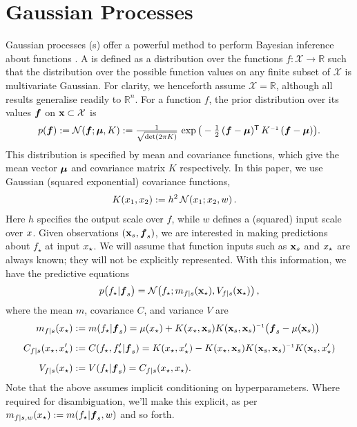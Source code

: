 \documentclass{article} %
\renewcommand{\pskinny}[2]{p\big(#1|#2\big)}
\begin{document}
\section{Gaussian Processes}
Gaussian processes (\gp s) offer a powerful method to perform Bayesian inference about functions \cite{GPsBook}. A \gpb is defined as a distribution over the functions $f: \mathcal{X} \rightarrow \mathbb{R}$ such that the distribution over the possible function values on any finite subset of $\mathcal{X}$ is multivariate Gaussian. For clarity, we henceforth assume $\mathcal{X} = \mathbb{R}$, although all results generalise readily to $\mathbb{R}^n$. For a function $f$, the prior distribution over its values $\vf$ on $\vlfv \subset \mathcal{X}$ is
\begin{align}%
\textstyle
 \po{\vf}\deq \N{\vf}{\vmu}{K}
 \deq\frac{1}{\sqrt{\det({2\pi K})}}\,\exp \big(-\frac{1}{2}\,(\vf-\vmu)\tra\,K\inv\,(\vf-\vmu)\big).
\end{align}
This distribution is specified by mean and covariance functions, which give the mean vector $\vmu$ and covariance matrix $K$ respectively. 
In this paper, we use Gaussian (squared exponential) covariance functions,
\begin{align} \label{eq:Gaussian_cov_fn}
\textstyle
K(\lfv_1,\lfv_2)& \deq h^2\,\N{\lfv_1}{\lfv_2}{w}.
\end{align} 
Here $h$ specifies the output scale over $f$, while $w$ defines a (squared) input scale over $\lfv$. 
Given observations $(\vlfv_s,\vf_s)$, we are interested in making predictions about  $f_\star$ at input $\lfv_\star$. We will assume that function inputs such as $\vlfv_s$ and $\lfv_\star$ are always known; they will not be explicitly represented. With this information, we have the predictive equations
\begin{equation}
 \pskinny{f\st}{\vf_s} = 
\bN{f\st}
{\meancond{f}{\vlfv_\star}{s}}
{\covcond{f}{\vlfv_\star}{s}}\,,
\end{equation}
where the mean $m$, covariance $C$, and variance $V$ are
\begin{align} 
\textstyle
\meancond{f}{\lfv_\star}{s}
& \deq \mean{f_\star}{\vf_s}
= \mu(\lfv_\star)+
K(\lfv_\star,\vlfv_s)
K(\vlfv_s,\vlfv_s)\inv
\bigl(\vf_s-{\mu}(\vlfv_s)\bigr)\label{eq:GPMean}
\\[0.2cm]
C_{f|s}(\lfv_\star, \lfv'_\star)
& \deq C(f_\star,f'_\star|\vf_s) 
=K(\lfv_\star,\lfv'_\star) - 
K(\lfv_\star,\vlfv_s)
K(\vlfv_s,\vlfv_s)\inv
K(\vlfv_s,\lfv'_\star)%
\\[0.2cm]
\covcond{f}{\lfv_\star}{s}
&\deq {\cov{f_\star}{\vf_s}} 
= C_{f|s}(\lfv_\star, \lfv_\star).
\end{align} 
Note that the above assumes implicit conditioning on hyperparameters. Where required for disambiguation, we'll make this explicit, as per $m_{f|s,w}(x\st) \deq \mean{f\st}{\vf_s, w}$ and so forth.
\end{document}
